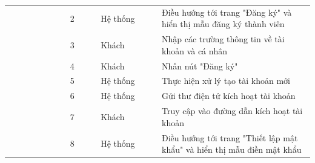 \documentclass[../DoAn.tex]{subfiles}
\begin{document}
\begin{table}[ht]
\begin{tabular}{| p{0.2\linewidth} | p{0.1\linewidth} | p{0.2\linewidth} | p{0.5\linewidth} |}
                                                                     & \multicolumn{1}{p{0.1\linewidth}|}{2}                                                  & \multicolumn{1}{p{0.2\linewidth}|}{Hệ thống}               & \multicolumn{1}{p{0.5\linewidth}|}{Điều hướng tới trang "Đăng ký" và hiển thị mẫu đăng ký thành viên}                   \\ \cline{2-4}
                                                                     & \multicolumn{1}{p{0.1\linewidth}|}{3}                                                  & \multicolumn{1}{p{0.2\linewidth}|}{Khách}                  & \multicolumn{1}{p{0.5\linewidth}|}{Nhập các trường thông tin về tài khoản và cá nhân}                                   \\ \cline{2-4}
                                                                     & \multicolumn{1}{p{0.1\linewidth}|}{4}                                                  & \multicolumn{1}{p{0.2\linewidth}|}{Khách}                  & \multicolumn{1}{p{0.5\linewidth}|}{Nhấn nút "Đăng ký"}                                                                  \\ \cline{2-4}
                                                                     & \multicolumn{1}{p{0.1\linewidth}|}{5}                                                  & \multicolumn{1}{p{0.2\linewidth}|}{Hệ thống}               & \multicolumn{1}{p{0.5\linewidth}|}{Thực hiện xử lý tạo tài khoản mới}                                                   \\ \cline{2-4}
                                                                     & \multicolumn{1}{p{0.1\linewidth}|}{6}                                                  & \multicolumn{1}{p{0.2\linewidth}|}{Hệ thống}               & \multicolumn{1}{p{0.5\linewidth}|}{Gửi thư điện tử kích hoạt tài khoản}                                                 \\ \cline{2-4}
                                                                     & \multicolumn{1}{p{0.1\linewidth}|}{7}                                                  & \multicolumn{1}{p{0.2\linewidth}|}{Khách}                  & \multicolumn{1}{p{0.5\linewidth}|}{Truy cập vào đường dẫn kích hoạt tài khoản}                                          \\ \cline{2-4}
                                                                     & \multicolumn{1}{p{0.1\linewidth}|}{8}                                                  & \multicolumn{1}{p{0.2\linewidth}|}{Hệ thống}               & \multicolumn{1}{p{0.5\linewidth}|}{Điều hướng tới trang "Thiết lập mật khẩu" và hiển thị mẫu điền mật khẩu}             \\ \cline{2-4}

\end{tabular}
\end{table}
\end{document}
